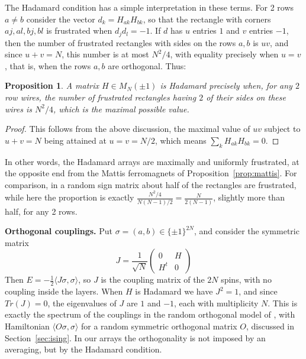 \documentclass[11pt,a4paper]{article}
\newtheorem{prop}[thm]{Proposition}
\theoremstyle{remark}
\begin{document}
The Hadamard condition has a simple interpretation in these terms. For 2 rows $a\neq b$ consider the vector $d_k=H_{ak}H_{bk}$, so that the rectangle with corners $aj,al,bj,bl$ is frustrated when $d_jd_l=-1$. If $d$ has $u$ entries $1$ and $v$ entries $-1$, then the number of frustrated rectangles with sides on the rows $a,b$ is $uv$, and since $u+v=N$, this number is at most $N^2/4$, with equality precisely when $u=v$, that is, when the rows $a,b$ are orthogonal. Thus:

\begin{samepage}
\begin{prop}\label{prop:frustration}
A matrix $H\in M_N(\pm1)$ is Hadamard precisely when, for any $2$ row wires, the number of frustrated rectangles having $2$ of their sides on these wires is $N^2/4$, which is the maximal possible value.
\end{prop}
\end{samepage}

\begin{proof}
This follows from the above discussion, the maximal value of $uv$ subject to $u+v=N$ being attained at $u=v=N/2$, which means $\sum_kH_{ak}H_{bk}=0$.
\end{proof}

In other words, the Hadamard arrays are maximally and uniformly frustrated, at the opposite end from the Mattis ferromagnets of Proposition~\ref{prop:mattis}. For comparison, in a random sign matrix about half of the rectangles are frustrated, while here the proportion is exactly $\frac{N^2/4}{N(N-1)/2}=\frac{N}{2(N-1)}$, slightly more than half, for any 2 rows.

\medskip

\noindent\textbf{Orthogonal couplings.}
Put $\sigma=(a,b)\in\{\pm1\}^{2N}$, and consider the symmetric matrix
\[
 J=\frac{1}{\sqrt N}\begin{pmatrix}0&H\\H^t&0\end{pmatrix}
\]
Then $E=-\frac{1}{2}\langle J\sigma,\sigma\rangle$, so $J$ is the coupling matrix of the $2N$ spins, with no coupling inside the layers. When $H$ is Hadamard we have $J^2=1$, and since $Tr(J)=0$, the eigenvalues of $J$ are $1$ and $-1$, each with multiplicity $N$. This is exactly the spectrum of the couplings in the random orthogonal model of \cite{mp2}, with Hamiltonian $\langle O\sigma,\sigma\rangle$ for a random symmetric orthogonal matrix $O$, discussed in Section~\ref{sec:ising}. In our arrays the orthogonality is not imposed by an averaging, but by the Hadamard condition.
\end{document}
